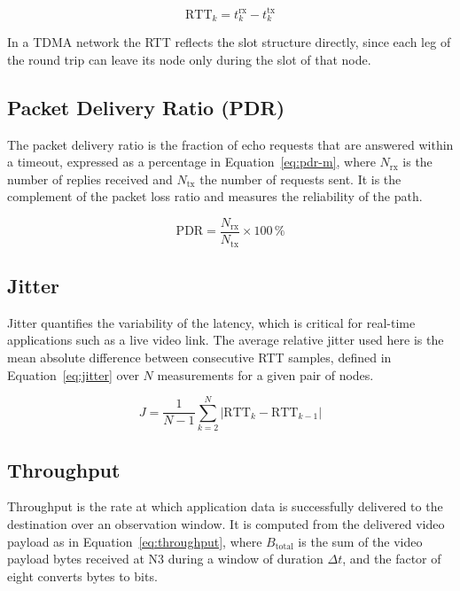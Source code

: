 \begin{equation}
\mathrm{RTT}_k = t^{\mathrm{rx}}_k - t^{\mathrm{tx}}_k
\label{eq:rtt}
\end{equation}

In a TDMA network the RTT reflects the slot structure directly, since each leg
of the round trip can leave its node only during the slot of that node.

\subsection{Packet Delivery Ratio (PDR)}
\label{subsec:m-pdr}

The packet delivery ratio is the fraction of echo requests that are answered
within a timeout, expressed as a percentage in Equation~\ref{eq:pdr-m}, where
$N_{\mathrm{rx}}$ is the number of replies received and $N_{\mathrm{tx}}$ the
number of requests sent. It is the complement of the packet loss ratio and
measures the reliability of the path.

\begin{equation}
\mathrm{PDR} = \frac{N_{\mathrm{rx}}}{N_{\mathrm{tx}}} \times 100\,\%
\label{eq:pdr-m}
\end{equation}

\subsection{Jitter}
\label{subsec:m-jitter}

Jitter quantifies the variability of the latency, which is critical for
real-time applications such as a live video link. The average relative jitter
used here is the mean absolute difference between consecutive RTT samples,
defined in Equation~\ref{eq:jitter} over $N$ measurements for a given pair of
nodes.

\begin{equation}
J = \frac{1}{N-1}\sum_{k=2}^{N}\bigl\lvert \mathrm{RTT}_k - \mathrm{RTT}_{k-1}\bigr\rvert
\label{eq:jitter}
\end{equation}

\subsection{Throughput}
\label{subsec:m-throughput}

Throughput is the rate at which application data is successfully delivered to
the destination over an observation window. It is computed from the delivered
video payload as in Equation~\ref{eq:throughput}, where $B_{\mathrm{total}}$ is
the sum of the video payload bytes received at N3 during a window of duration
$\Delta t$, and the factor of eight converts bytes to bits.

